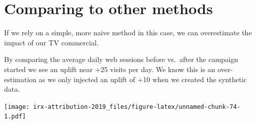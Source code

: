 \documentclass[]{book}
\begin{document}
\hypertarget{comparing-to-other-methods}{%
\section{Comparing to other methods}\label{comparing-to-other-methods}}

If we rely on a simple, more naive method in this case, we can overestimate the
impact of our TV commercial.

By comparing the average daily web sessions before vs.~after the campaign started
we see an uplift near +25 visits per day. We know this is an over-estimation as
we only injected an uplift of +10 when we created the synthetic data.

\texttt{[image: irx-attribution-2019\_files/figure-latex/unnamed-chunk-74-1.pdf]}


\end{document}
